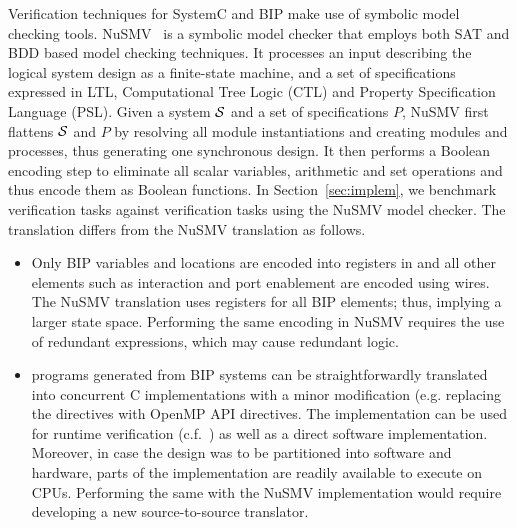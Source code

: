 Verification techniques for SystemC and BIP make use of symbolic model checking tools. 
NuSMV~\cite{nusmv} is a symbolic model checker that employs both 
SAT and BDD based model checking techniques. It processes an input 
describing the logical system design as a finite-state machine, and a set of specifications
expressed in LTL, Computational Tree Logic (CTL) and Property Specification Language (PSL).
Given a system $\mathcal{S}$ and a set of specifications $P$, NuSMV first flattens $\mathcal{S}$ and $P$ by 
resolving all module instantiations and creating modules and processes, thus generating one 
synchronous design. It then performs a Boolean encoding step to eliminate all scalar variables, 
arithmetic and set operations and thus encode them as Boolean functions.
In Section~\ref{sec:implem}, we benchmark \biptool{} verification tasks 
against verification tasks using the NuSMV model checker. 
The \caig translation differs from the NuSMV translation as follows. 
%
\begin{itemize}
  \item
Only BIP variables and locations are encoded into registers in 
\caig and all 
other elements such as interaction and port enablement  
are encoded using wires. 
The NuSMV translation uses registers for all BIP elements;
thus, implying a larger state space. 
Performing the same encoding in NuSMV requires the use of redundant 
expressions, which may cause redundant logic. 
\item 
%
 \caig programs generated from BIP systems can be straightforwardly
 translated into concurrent C implementations with a minor modification (e.g. replacing the  
    directives with OpenMP API directives.
%
 The implementation can be used for runtime verification (c.f.~\cite{FalconeHR13}) as well as a direct
 software implementation.  
 Moreover, in case the design was to be partitioned into software and hardware, 
 parts of the implementation are readily available to execute on CPUs. 
 Performing the same with the NuSMV implementation would require developing 
 a new source-to-source translator. 
\end{itemize}


